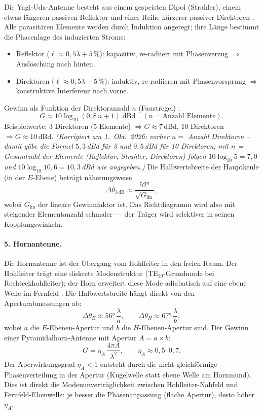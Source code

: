 Die Yagi-Uda-Antenne besteht aus einem gespeisten Dipol (Strahler), einem
etwas längeren passiven Reflektor und einer Reihe kürzerer passiver Direktoren
\cite{Yagi1928,Balanis2016}. Alle parasitären Elemente werden durch Induktion angeregt; ihre Länge
bestimmt die Phasenlage des induzierten Stroms:
\begin{itemize}[nosep]
  \item Reflektor ($\ell \approx 0{,}5\lambda + 5\,\%$): kapazitiv,
    re-radiiert mit Phasenverzug $\Rightarrow$ Auslöschung nach hinten.
  \item Direktoren ($\ell \approx 0{,}5\lambda - 5\,\%$): induktiv,
    re-radiieren mit Phasenvorsprung $\Rightarrow$ konstruktive Interferenz
    nach vorne.
\end{itemize}
Gewinn als Funktion der Direktoranzahl $n$ (Faustregel) \EM:
\[
  G \approx 10\log_{10}(0{,}8\,n + 1)\;\mathrm{dBd}
  \quad (n = \text{Anzahl Elemente}).
\]
Beispielwerte: 3 Direktoren (5 Elemente) $\Rightarrow G \approx 7\,\mathrm{dBd}$,
10 Direktoren $\Rightarrow G \approx 10\,\mathrm{dBd}$.
\textit{(Korrigiert am 1.~Okt.~2026: vorher $n = $ Anzahl Direktoren -- damit gäbe die Formel $5{,}3$\,dBd für 3 und $9{,}5$\,dBd für 10 Direktoren; mit $n$ = Gesamtzahl der Elemente (Reflektor, Strahler, Direktoren) folgen $10\log_{10}5 = 7{,}0$ und $10\log_{10}10{,}6 = 10{,}3$\,dBd wie angegeben.)}
Die Halbwertsbreite der Hauptkeule (in der $E$-Ebene) beträgt näherungsweise
\[
  \Delta\theta_{3\,\mathrm{dB}} \approx \frac{52°}{\sqrt{G_\mathrm{lin}}},
\]
wobei $G_\mathrm{lin}$ der lineare Gewinnfaktor ist. Das Richtdiagramm wird
also mit steigender Elementanzahl schmaler --- der Träger wird selektiver in
seinen Kopplungswinkeln.

\paragraph{5. Hornantenne.}

Die Hornantenne ist der Übergang vom Hohlleiter in den freien Raum.
Der Hohlleiter trägt eine diskrete Modenstruktur (TE$_{10}$-Grundmode
bei Rechteckhohlleiter); der Horn erweitert diese Mode adiabatisch auf
eine ebene Welle im Fernfeld \cite{Balanis2016,Pozar2012}. Die Halbwertsbreite hängt direkt von
den Aperturabmessungen ab:
\[
  \Delta\theta_{E} \approx 56°\,\frac{\lambda}{a}, \qquad
  \Delta\theta_{H} \approx 67°\,\frac{\lambda}{b},
\]
wobei $a$ die $E$-Ebenen-Apertur und $b$ die $H$-Ebenen-Apertur sind.
Der Gewinn einer Pyramidalhorn-Antenne mit Apertur $A = a \times b$:
\[
  G = \eta_A\,\frac{4\pi A}{\lambda^2}, \qquad \eta_A \approx 0{,}5\text{--}0{,}7.
\]
Der Aperwirkungsgrad $\eta_A < 1$ entsteht durch die nicht-gleichförmige
Phasenverteilung in der Apertur (Kugelwelle statt ebene Welle am Hornmund).
Dies ist direkt die Modenunverträglichkeit zwischen Hohlleiter-Nahfeld und
Fernfeld-Ebenwelle: je besser die Phasenanpassung (flache Apertur), desto
höher $\eta_A$.


